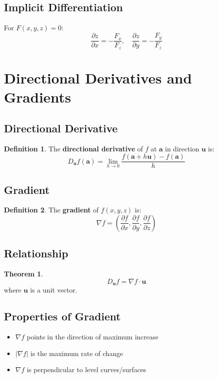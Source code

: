 \documentclass[11pt]{article}
\theoremstyle{definition}
\newtheorem{definition}{Definition}[section]
\newtheorem{theorem}{Theorem}[section]
\begin{document}
\subsection{Implicit Differentiation}
For $F(x,y,z) = 0$:
$$\frac{\partial z}{\partial x} = -\frac{F_x}{F_z}, \quad \frac{\partial z}{\partial y} = -\frac{F_y}{F_z}$$

\section{Directional Derivatives and Gradients}

\subsection{Directional Derivative}
\begin{definition}
The \textbf{directional derivative} of $f$ at $\mathbf{a}$ in direction $\mathbf{u}$ is:
$$D_{\mathbf{u}} f(\mathbf{a}) = \lim_{h \to 0} \frac{f(\mathbf{a} + h\mathbf{u}) - f(\mathbf{a})}{h}$$
\end{definition}

\subsection{Gradient}
\begin{definition}
The \textbf{gradient} of $f(x,y,z)$ is:
$$\nabla f = \left(\frac{\partial f}{\partial x}, \frac{\partial f}{\partial y}, \frac{\partial f}{\partial z}\right)$$
\end{definition}

\subsection{Relationship}
\begin{theorem}
$$D_{\mathbf{u}} f = \nabla f \cdot \mathbf{u}$$
where $\mathbf{u}$ is a unit vector.
\end{theorem}

\subsection{Properties of Gradient}
\begin{itemize}
    \item $\nabla f$ points in the direction of maximum increase
    \item $|\nabla f|$ is the maximum rate of change
    \item $\nabla f$ is perpendicular to level curves/surfaces
\end{itemize}
\end{document}
